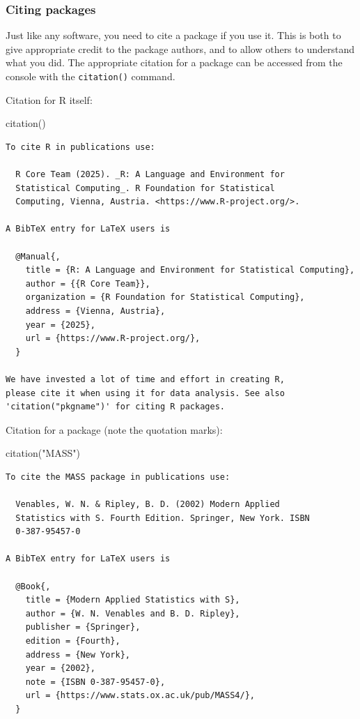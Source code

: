\documentclass[
  13,
  letterpaper,
]{report}
\newenvironment{Shaded}{\begin{snugshade}}{\end{snugshade}}
\newcommand{\FunctionTok}[1]{\textcolor[rgb]{0.28,0.35,0.67}{#1}}
\newcommand{\NormalTok}[1]{\textcolor[rgb]{0.00,0.23,0.31}{#1}}
\newcommand{\StringTok}[1]{\textcolor[rgb]{0.13,0.47,0.30}{#1}}
\begin{document}
\subsubsection{Citing packages}\label{sec-02-pack-work-cite}

Just like any software, you need to cite a package if you use it. This
is both to give appropriate credit to the package authors, and to allow
others to understand what you did. The appropriate citation for a
package can be accessed from the console with the \texttt{citation()}
command.

Citation for R itself:

\begin{Shaded}
\begin{Highlighting}[]
\FunctionTok{citation}\NormalTok{()}
\end{Highlighting}
\end{Shaded}

\begin{verbatim}
To cite R in publications use:

  R Core Team (2025). _R: A Language and Environment for
  Statistical Computing_. R Foundation for Statistical
  Computing, Vienna, Austria. <https://www.R-project.org/>.

A BibTeX entry for LaTeX users is

  @Manual{,
    title = {R: A Language and Environment for Statistical Computing},
    author = {{R Core Team}},
    organization = {R Foundation for Statistical Computing},
    address = {Vienna, Austria},
    year = {2025},
    url = {https://www.R-project.org/},
  }

We have invested a lot of time and effort in creating R,
please cite it when using it for data analysis. See also
'citation("pkgname")' for citing R packages.
\end{verbatim}

Citation for a package (note the quotation marks):

\begin{Shaded}
\begin{Highlighting}[]
\FunctionTok{citation}\NormalTok{(}\StringTok{"MASS"}\NormalTok{)}
\end{Highlighting}
\end{Shaded}

\begin{verbatim}
To cite the MASS package in publications use:

  Venables, W. N. & Ripley, B. D. (2002) Modern Applied
  Statistics with S. Fourth Edition. Springer, New York. ISBN
  0-387-95457-0

A BibTeX entry for LaTeX users is

  @Book{,
    title = {Modern Applied Statistics with S},
    author = {W. N. Venables and B. D. Ripley},
    publisher = {Springer},
    edition = {Fourth},
    address = {New York},
    year = {2002},
    note = {ISBN 0-387-95457-0},
    url = {https://www.stats.ox.ac.uk/pub/MASS4/},
  }
\end{verbatim}
\end{document}
